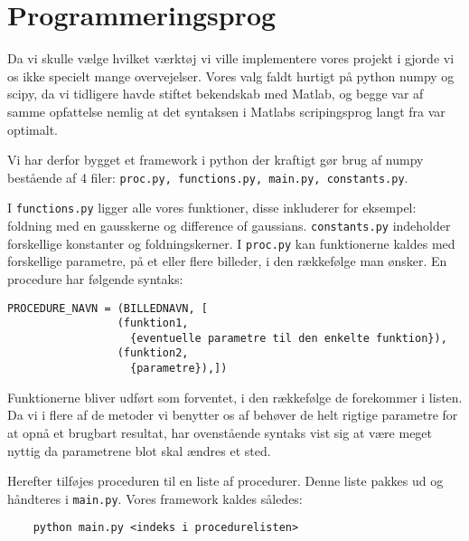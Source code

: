 \section{Programmeringsprog}
Da vi skulle vælge hvilket værktøj vi ville implementere vores projekt i gjorde vi os ikke specielt mange overvejelser. 
Vores valg faldt hurtigt på python numpy og scipy, da vi tidligere havde stiftet bekendskab med Matlab, og begge var af samme opfattelse nemlig
at det syntaksen i Matlabs scripingsprog langt fra var optimalt.


Vi har derfor bygget et framework i python der kraftigt gør brug af numpy bestående af 4 filer: \texttt{proc.py, functions.py, main.py, constants.py}.

I \texttt{functions.py} ligger alle vores funktioner, disse inkluderer for eksempel: foldning med en gausskerne og difference of gaussians.
\texttt{constants.py} indeholder forskellige konstanter og foldningskerner. I \texttt{proc.py} kan funktionerne kaldes med forskellige parametre, på et eller flere billeder, i den rækkefølge man ønsker.
En procedure har følgende syntaks:
\begin{verbatim}
PROCEDURE_NAVN = (BILLEDNAVN, [
                 (funktion1,
                   {eventuelle parametre til den enkelte funktion}),
                 (funktion2,
                   {parametre}),])
\end{verbatim}
Funktionerne bliver udført som forventet, i den rækkefølge de forekommer i listen.
Da vi i flere af de metoder vi benytter os af behøver de helt rigtige parametre for at opnå et brugbart resultat, har ovenstående syntaks vist sig at være meget nyttig da parametrene blot skal ændres et sted.

Herefter tilføjes proceduren til en liste af procedurer. Denne liste pakkes ud og håndteres i \texttt{main.py}. Vores framework kaldes således: 
\begin{verbatim}
	python main.py <indeks i procedurelisten>
\end{verbatim}

